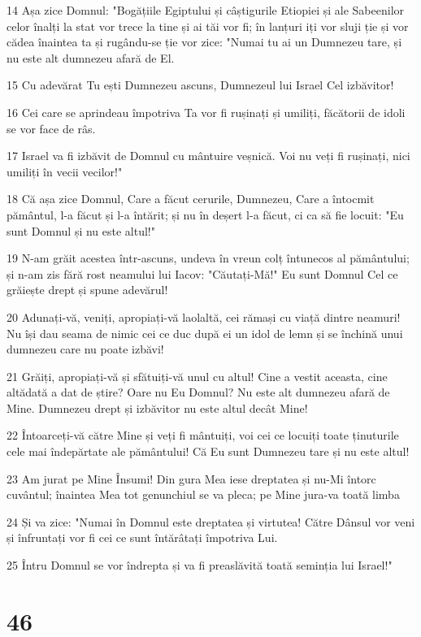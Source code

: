\par 14 Așa zice Domnul: "Bogățiile Egiptului și câștigurile Etiopiei și ale Sabeenilor celor înalți la stat vor trece la tine și ai tăi vor fi; în lanțuri iți vor sluji ție și vor cădea înaintea ta și rugându-se ție vor zice: "Numai tu ai un Dumnezeu tare, și nu este alt dumnezeu afară de El.
\par 15 Cu adevărat Tu ești Dumnezeu ascuns, Dumnezeul lui Israel Cel izbăvitor!
\par 16 Cei care se aprindeau împotriva Ta vor fi rușinați și umiliți, făcătorii de idoli se vor face de râs.
\par 17 Israel va fi izbăvit de Domnul cu mântuire veșnică. Voi nu veți fi rușinați, nici umiliți în vecii vecilor!"
\par 18 Că așa zice Domnul, Care a făcut cerurile, Dumnezeu, Care a întocmit pământul, l-a făcut și l-a întărit; și nu în deșert l-a făcut, ci ca să fie locuit: "Eu sunt Domnul și nu este altul!"
\par 19 N-am grăit acestea într-ascuns, undeva în vreun colț întunecos al pământului; și n-am zis fără rost neamului lui Iacov: "Căutați-Mă!" Eu sunt Domnul Cel ce grăiește drept și spune adevărul!
\par 20 Adunați-vă, veniți, apropiați-vă laolaltă, cei rămași cu viață dintre neamuri! Nu își dau seama de nimic cei ce duc după ei un idol de lemn și se închină unui dumnezeu care nu poate izbăvi!
\par 21 Grăiți, apropiați-vă și sfătuiți-vă unul cu altul! Cine a vestit aceasta, cine altădată a dat de știre? Oare nu Eu Domnul? Nu este alt dumnezeu afară de Mine. Dumnezeu drept și izbăvitor nu este altul decât Mine!
\par 22 Întoarceți-vă către Mine și veți fi mântuiți, voi cei ce locuiți toate ținuturile cele mai îndepărtate ale pământului! Că Eu sunt Dumnezeu tare și nu este altul!
\par 23 Am jurat pe Mine Însumi! Din gura Mea iese dreptatea și nu-Mi întorc cuvântul; înaintea Mea tot genunchiul se va pleca; pe Mine jura-va toată limba
\par 24 Și va zice: "Numai în Domnul este dreptatea și virtutea! Către Dânsul vor veni și înfruntați vor fi cei ce sunt întărâtați împotriva Lui.
\par 25 Întru Domnul se vor îndrepta și va fi preaslăvită toată seminția lui Israel!"

\chapter{46}

